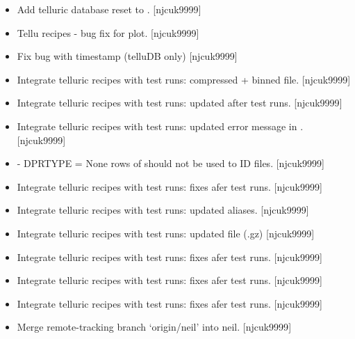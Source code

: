 \documentclass[a4paper,10pt,english]{report}
\begin{document}
\label{\detokenize{misc/changelog:id387}}\begin{itemize}
\item {} 
Add telluric database reset to . {[}njcuk9999{]}

\item {} 
Tellu recipes - bug fix for plot. {[}njcuk9999{]}

\item {} 
Fix bug with timestamp (telluDB only) {[}njcuk9999{]}

\item {} 
Integrate telluric recipes with test runs: compressed + binned
 file. {[}njcuk9999{]}

\item {} 
Integrate telluric recipes with test runs: updated after test runs.
{[}njcuk9999{]}

\item {} 
Integrate telluric recipes with test runs: updated error message in
. {[}njcuk9999{]}

\item {} 
 - DPRTYPE = None  rows of  should not be
used to ID files. {[}njcuk9999{]}

\item {} 
Integrate telluric recipes with test runs: fixes afer test runs.
{[}njcuk9999{]}

\item {} 
Integrate telluric recipes with test runs: updated aliases.
{[}njcuk9999{]}

\item {} 
Integrate telluric recipes with test runs: updated  file
(.gz) {[}njcuk9999{]}

\item {} 
Integrate telluric recipes with test runs: fixes afer test runs.
{[}njcuk9999{]}

\item {} 
Integrate telluric recipes with test runs: fixes afer test runs.
{[}njcuk9999{]}

\item {} 
Integrate telluric recipes with test runs: fixes afer test runs.
{[}njcuk9999{]}

\item {} 
Merge remote-tracking branch ‘origin/neil’ into neil. {[}njcuk9999{]}

\end{itemize}
\end{document}
